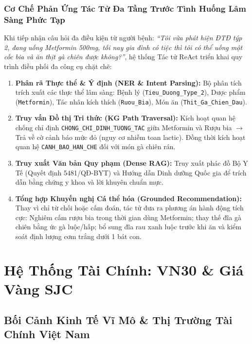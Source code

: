 \documentclass[12pt,a4paper]{report}
\begin{document}
\subsection{Cơ Chế Phản Ứng Tác Tử Đa Tầng Trước Tình Huống Lâm Sàng Phức Tạp}
Khi tiếp nhận câu hỏi đa điều kiện từ người bệnh: \textit{“Tôi vừa phát hiện ĐTĐ týp 2, đang uống Metformin 500mg, tối nay gia đình có tiệc thì tôi có thể uống một cốc bia và ăn thịt gà chiên được không?”}, hệ thống Tác tử ReAct triển khai quy trình điều phối đa công cụ chặt chẽ:
\begin{enumerate}[itemsep=2pt, parsep=0pt, topsep=3pt]
    \item \textbf{Phân rã Thực thể \& Ý định (NER \& Intent Parsing):} Bộ phân tích trích xuất các thực thể lâm sàng: Bệnh lý (\texttt{Tieu\_Duong\_Type\_2}), Dược phẩm (\texttt{Metformin}), Tác nhân kích thích (\texttt{Ruou\_Bia}), Món ăn (\texttt{Thit\_Ga\_Chien\_Dau}).
    \item \textbf{Truy vấn Đồ thị Tri thức (KG Path Traversal):} Kích hoạt quan hệ chống chỉ định \texttt{CHONG\_}\allowbreak\texttt{CHI\_DINH\_}\allowbreak\texttt{TUONG\_TAC} giữa Metformin và Rượu bia $\rightarrow$ Trả về cờ cảnh báo mức đỏ (nguy cơ nhiễm toan lactic). Đồng thời kích hoạt quan hệ \texttt{CANH\_}\allowbreak\texttt{BAO\_}\allowbreak\texttt{HAN\_CHE} đối với món gà chiên rán.
    \item \textbf{Truy xuất Văn bản Quy phạm (Dense RAG):} Truy xuất phác đồ Bộ Y Tế (Quyết định 5481/QĐ-BYT) và Hướng dẫn Dinh dưỡng Quốc gia để trích dẫn bằng chứng y khoa và lời khuyên chuẩn mực.
    \item \textbf{Tổng hợp Khuyến nghị Cá thể hóa (Grounded Recommendation):} Thay vì chỉ từ chối hoặc cấm đoán, tác tử đưa ra phương án hành động tích cực: Nghiêm cấm rượu bia trong thời gian dùng Metformin; thay thế đĩa gà chiên bằng ức gà luộc/hấp; bổ sung đĩa rau xanh luộc trước khi ăn và kiểm soát định lượng cơm trắng dưới 1 bát con.
\end{enumerate}

\newpage

\chapter{Hệ Thống Tài Chính: VN30 \& Giá Vàng SJC}

\section{Bối Cảnh Kinh Tế Vĩ Mô \& Thị Trường Tài Chính Việt Nam}
\end{document}
